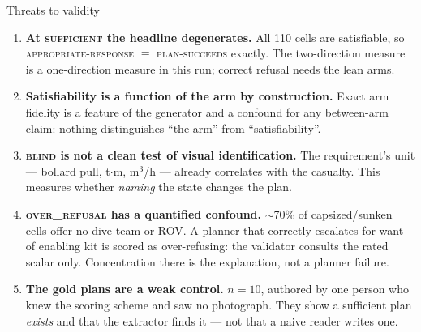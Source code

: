 \documentclass[aspectratio=169,11pt]{beamer}
\newcommand{\cs}[1]{\textsc{\small #1}}
\begin{document}
\begin{frame}[allowframebreaks]{Threats to validity}

\small
\begin{enumerate}
  \item \textbf{At \cs{sufficient} the headline degenerates.} All 110 cells are
        satisfiable, so \cs{appropriate-response} $\equiv$ \cs{plan-succeeds} exactly.
        The two-direction measure is a one-direction measure in this run; correct refusal
        needs the lean arms.

  \item \textbf{Satisfiability is a function of the arm by construction.} Exact arm
        fidelity is a feature of the generator and a confound for any between-arm claim:
        nothing distinguishes ``the arm'' from ``satisfiability''.

  \item \textbf{\cs{blind} is not a clean test of visual identification.} The
        requirement's unit --- bollard pull, t$\cdot$m, m$^3$/h --- already correlates
        with the casualty. This measures whether \emph{naming} the state changes the
        plan.

  \item \textbf{\cs{over\_refusal} has a quantified confound.} $\sim$70\% of
        capsized/sunken cells offer no dive team or ROV. A planner that correctly
        escalates for want of enabling kit is scored as over-refusing: the validator
        consults the rated scalar only. Concentration there is the explanation, not a
        planner failure.

  \item \textbf{The gold plans are a weak control.} $n=10$, authored by one person who
        knew the scoring scheme and saw no photograph. They show a sufficient plan
        \emph{exists} and that the extractor finds it --- not that a naive reader writes one.
\end{enumerate}

\end{frame}

\end{document}
